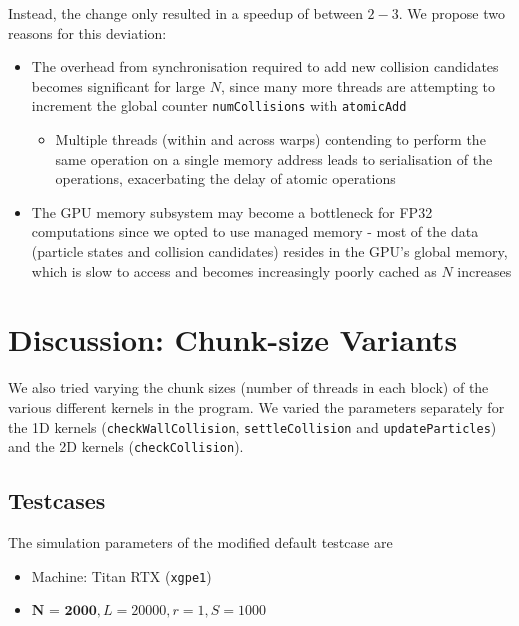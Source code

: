 \documentclass[12pt]{article}
\begin{document}
Instead, the change only resulted in a speedup of between $2-3$. We propose two reasons for this deviation:
\begin{itemize}
    \item The overhead from synchronisation required to add new collision candidates becomes significant for large $N$, since many more threads are attempting to increment the global counter \texttt{numCollisions} with \texttt{atomicAdd}
    \begin{itemize}
        \item Multiple threads (within and across warps) contending to perform the same operation on a single memory address leads to serialisation of the operations, exacerbating the delay of atomic operations
    \end{itemize}
    \item The GPU memory subsystem may become a bottleneck for FP32 computations since we opted to use managed memory - most of the data (particle states and collision candidates) resides in the GPU's global memory, which is slow to access and becomes increasingly poorly cached as $N$ increases
\end{itemize}

\pagebreak

\section{Discussion: Chunk-size Variants}

We also tried varying the chunk sizes (number of threads in each block) of the various different kernels in the program. We varied the parameters separately for the 1D kernels (\texttt{checkWallCollision}, \texttt{settleCollision} and \texttt{updateParticles}) and the 2D kernels (\texttt{checkCollision}).

\subsection{Testcases}
The simulation parameters of the modified default testcase are
\begin{itemize}
    \item Machine: Titan RTX (\texttt{xgpe1})
	\item $\textbf{N = 2000}, L=20000, r=1, S=1000$
\end{itemize}
\end{document}
